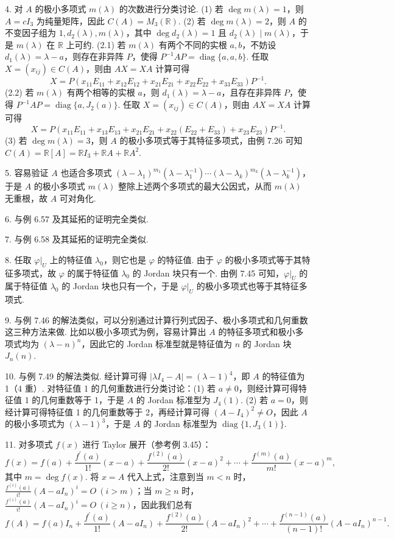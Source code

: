 \documentclass[UTF8,12pt,a4paper,fontset=fandol]{ctexart}
\begin{document}
4. 对 $A$ 的极小多项式 $m(\lambda)$ 的次数进行分类讨论. (1) 若 $\deg m(\lambda)=1$，则 $A=cI_3$ 为纯量矩阵，因此 $C(A)=M_3(\mathbb{R})$. (2) 若 $\deg m(\lambda)=2$，则 $A$ 的不变因子组为 $1,d_2(\lambda),m(\lambda)$，其中 $\deg d_2(\lambda)=1$ 且 $d_2(\lambda)\mid m(\lambda)$，于是 $m(\lambda)$ 在 $\mathbb{R}$ 上可约. (2.1) 若 $m(\lambda)$ 有两个不同的实根 $a,b$，不妨设 $d_1(\lambda)=\lambda-a$，则存在非异阵 $P$，使得 $P^{-1}AP=\operatorname{diag}\{a,a,b\}$. 任取 $X=(x_{ij})\in C(A)$，则由 $AX=XA$ 计算可得
\[
X=P(x_{11}E_{11}+x_{12}E_{12}+x_{21}E_{21}+x_{22}E_{22}+x_{33}E_{33})P^{-1}.
\]
(2.2) 若 $m(\lambda)$ 有两个相等的实根 $a$，则 $d_1(\lambda)=\lambda-a$，且存在非异阵 $P$，使得 $P^{-1}AP=\operatorname{diag}\{a,J_2(a)\}$. 任取 $X=(x_{ij})\in C(A)$，则由 $AX=XA$ 计算可得
\[
X=P(x_{11}E_{11}+x_{13}E_{13}+x_{21}E_{21}+x_{22}(E_{22}+E_{33})+x_{23}E_{23})P^{-1}.
\]
(3) 若 $\deg m(\lambda)=3$，则 $A$ 的极小多项式等于其特征多项式，由例 7.26 可知 $C(A)=\mathbb{R}[A]=\mathbb{R}I_3+\mathbb{R}A+\mathbb{R}A^2$.

5. 容易验证 $A$ 也适合多项式 $(\lambda-\lambda_1)^{m_1}(\lambda-\lambda_1^{-1})\cdots(\lambda-\lambda_k)^{m_k}(\lambda-\lambda_k^{-1})$，于是 $A$ 的极小多项式 $m(\lambda)$ 整除上述两个多项式的最大公因式，从而 $m(\lambda)$ 无重根，故 $A$ 可对角化.

6. 与例 6.57 及其延拓的证明完全类似.

7. 与例 6.58 及其延拓的证明完全类似.

8. 任取 $\varphi|_U$ 上的特征值 $\lambda_0$，则它也是 $\varphi$ 的特征值. 由于 $\varphi$ 的极小多项式等于其特征多项式，故 $\varphi$ 的属于特征值 $\lambda_0$ 的 Jordan 块只有一个. 由例 7.45 可知，$\varphi|_U$ 的属于特征值 $\lambda_0$ 的 Jordan 块也只有一个，于是 $\varphi|_U$ 的极小多项式也等于其特征多项式.

9. 与例 7.46 的解法类似，可以分别通过计算行列式因子、极小多项式和几何重数这三种方法来做. 比如以极小多项式为例，容易计算出 $A$ 的特征多项式和极小多项式均为 $(\lambda-n)^n$，因此它的 Jordan 标准型就是特征值为 $n$ 的 Jordan 块 $J_n(n)$.

10. 与例 7.49 的解法类似. 经计算可得 $|\lambda I_4-A|=(\lambda-1)^4$，即 $A$ 的特征值为 1（4 重）. 对特征值 1 的几何重数进行分类讨论：(1) 若 $a\ne0$，则经计算可得特征值 1 的几何重数等于 1，于是 $A$ 的 Jordan 标准型为 $J_4(1)$. (2) 若 $a=0$，则经计算可得特征值 1 的几何重数等于 2，再经计算可得 $(A-I_4)^2\ne O$，因此 $A$ 的极小多项式为 $(\lambda-1)^3$，于是 $A$ 的 Jordan 标准型为 $\operatorname{diag}\{1,J_3(1)\}$.

11. 对多项式 $f(x)$ 进行 Taylor 展开（参考例 3.45）：
\[
f(x)=f(a)+\frac{f^{\prime}(a)}{1!}(x-a)+\frac{f^{(2)}(a)}{2!}(x-a)^2+\cdots+\frac{f^{(m)}(a)}{m!}(x-a)^m,
\]
其中 $m=\deg f(x)$. 将 $x=A$ 代入上式，注意到当 $m<n$ 时，$\frac{f^{(i)}(a)}{i!}(A-aI_n)^i=O\ (i>m)$；当 $m\ge n$ 时，$\frac{f^{(i)}(a)}{i!}(A-aI_n)^i=O\ (i\ge n)$，因此我们总有
\[
f(A)=f(a)I_n+\frac{f^{\prime}(a)}{1!}(A-aI_n)+\frac{f^{(2)}(a)}{2!}(A-aI_n)^2+\cdots+\frac{f^{(n-1)}(a)}{(n-1)!}(A-aI_n)^{n-1}.
\]
\end{document}
